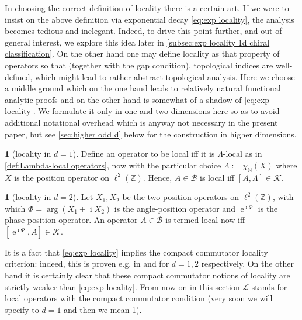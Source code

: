 \documentclass[a4paper,10pt]{article}
\numberwithin{equation}{section}
\theoremstyle{plain}
\theoremstyle{plain}
\theoremstyle{plain}
\theoremstyle{plain}
\theoremstyle{plain}
\theoremstyle{remark}
\theoremstyle{definition}
\newtheorem{defn}[thm]{\protect\definitionname}
\theoremstyle{plain}
\providecommand{\definitionname}{Definition}
\newcommand{\ee}{\operatorname{e}}
\newcommand{\ii}{\operatorname{i}}
\newcommand{\ZZ}{\mathbb{Z}}
\newcommand{\NN}{\mathbb{N}}
\newcommand{\calB}{\mathcal{B}}
\newcommand{\calK}{\mathcal{K}}
\newcommand{\calL}{\mathcal{L}}
\begin{document}
	In choosing the correct definition of locality there is a certain art. If we were to insist on the above definition via exponential decay \cref{eq:exp locality}, the analysis becomes tedious and inelegant. Indeed, to drive this point further, and out of general interest, we explore this idea later in \cref{subsec:exp locality 1d chiral classification}. On the other hand one may define locality as that property of operators so that (together with the gap condition), topological indices are well-defined, which might lead to rather abstract topological analysis. Here we choose a middle ground which on the one hand leads to relatively natural functional analytic proofs and on the other hand is somewhat of a shadow of \cref{eq:exp locality}. We formulate it only in one and two dimensions here so as to avoid additional notational overhead which is anyway not necessary in the present paper, but see \cref{sec:higher odd d} below for the construction in higher dimensions.
	
	\begin{defn}[locality in $d=1$]\label{def:1d locality} Define an operator to be local iff it is $\Lambda$-local as in \cref{def:Lambda-local operators}, now with the particular choice $\Lambda:=\chi_\NN(X)$ where $X$ is the position operator on $\ell^2(\ZZ)$. Hence, $A\in\calB$ is local iff $[A,\Lambda]\in\calK$. 
	\end{defn}
	\begin{defn}[locality in $d=2$]\label{def:2d locality} Let $X_1,X_2$ be the two position operators on $\ell^2(\ZZ)$, with which $\Phi = \arg(X_1+\ii X_2)$ is the angle-position operator and $\ee^{\ii \Phi}$ is the phase position operator. An operator $A\in\calB$ is termed local now iff $[\ee^{\ii \Phi},A]\in\calK$.
	\end{defn}
	It is a fact that \cref{eq:exp locality} implies the compact commutator locality criterion: indeed, this is proven e.g. in \cite[Lemma 2 (b)]{Graf_Shapiro_2018_1D_Chiral_BEC} and \cite[Lemma A.1]{BSS23} for $d=1,2$ respectively. On the other hand it is certainly clear that these compact commutator notions of locality are strictly weaker than \cref{eq:exp locality}. From now on in this section $\calL$ stands for local operators with the compact commutator condition (very soon we will specify to $d=1$ and then we mean \cref{def:1d locality}).
	
\end{document}
